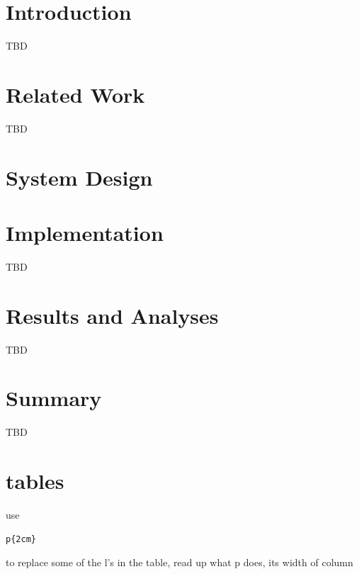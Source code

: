 \documentclass{sig-alternate}
\begin{document}
 
 
 
\section{Introduction} 

\cite{las12fg-bookchapter}

\cite{las2010gce}

TBD 
 
 
\section{Related Work} \label{S:related}
 
TBD 

 
\section{System Design} \label{S:design}

  
 
\section{Implementation} \label{S:implementation}

TBD
\section{Results and Analyses} \label{S:result}

TBD
 
 
\section{Summary}

TBD 


\section{tables}

use
\begin{verbatim}
p{2cm} 
\end{verbatim}
to replace some of the l's in the table, read up what p does, its
width of column
\end{document}
